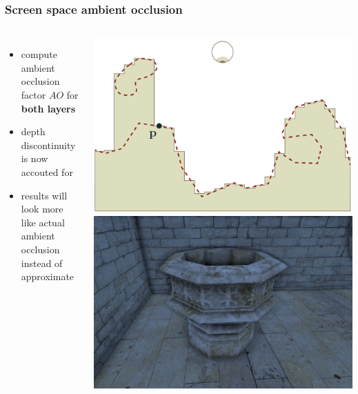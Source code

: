 \documentclass[aspectratio=169]{beamer}
\begin{document}
	\begin{frame}
		\frametitle{Screen space ambient occlusion}
		\begin{columns}
				\begin{itemize}
					\item compute ambient occlusion factor $AO$ for \textbf{both layers}
					\item depth discontinuity is now accouted for
					\item results will look more like actual ambient occlusion instead of approximate
				\end{itemize}
				\includegraphics[height=.65\textwidth]{img/ambient_occlusion_depth_discontinuity.png}
				\includegraphics[height=.65\textwidth]{img/screen_space_ambient_occlusion_halo.png}
		\end{columns}		
	\end{frame}	
\end{document}
